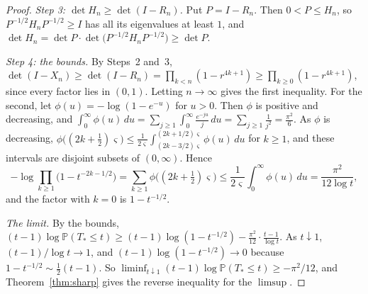 \documentclass[11pt]{amsart}
\theoremstyle{definition}
\theoremstyle{remark}
\numberwithin{equation}{section}
\newcommand{\PP}{\mathbb{P}}
\begin{document}
\begin{proof}
\emph{Step 3: $\det H_n\ge\det(I-R_n)$.} Put $P=I-R_n$. Then $0<P\le H_n$, so $P^{-1/2}H_nP^{-1/2}\ge I$ has all its eigenvalues at least $1$, and $\det H_n=\det P\cdot\det\bigl(P^{-1/2}H_nP^{-1/2}\bigr)\ge\det P$.

\emph{Step 4: the bounds.} By Steps~2 and~3, $\det(I-X_n)\ge\det(I-R_n)=\prod_{k<n}(1-r^{4k+1})\ge\prod_{k\ge0}(1-r^{4k+1})$, since every factor lies in $(0,1)$. Letting $n\to\infty$ gives the first inequality. For the second, let $\phi(u)=-\log(1-e^{-u})$ for $u>0$. Then $\phi$ is positive and decreasing, and $\int_0^\infty\phi(u)\,du=\sum_{j\ge1}\int_0^\infty\frac{e^{-ju}}j\,du=\sum_{j\ge1}\frac1{j^2}=\frac{\pi^2}6$. As $\phi$ is decreasing, $\phi\bigl((2k+\frac12)\varsigma\bigr)\le\frac1{2\varsigma}\int_{(2k-3/2)\varsigma}^{(2k+1/2)\varsigma}\phi(u)\,du$ for $k\ge1$, and these intervals are disjoint subsets of $(0,\infty)$. Hence
\[
-\log\prod_{k\ge1}\bigl(1-t^{-2k-1/2}\bigr)=\sum_{k\ge1}\phi\bigl((2k+\tfrac12)\varsigma\bigr)\le\frac1{2\varsigma}\int_0^\infty\phi(u)\,du=\frac{\pi^2}{12\log t},
\]
and the factor with $k=0$ is $1-t^{-1/2}$.

\emph{The limit.} By the bounds, $(t-1)\log\PP(T_*\le t)\ge(t-1)\log(1-t^{-1/2})-\frac{\pi^2}{12}\cdot\frac{t-1}{\log t}$. As $t\downarrow1$, $(t-1)/\log t\to1$, and $(t-1)\log(1-t^{-1/2})\to0$ because $1-t^{-1/2}\sim\frac12(t-1)$. So $\liminf_{t\downarrow1}(t-1)\log\PP(T_*\le t)\ge-\pi^2/12$, and Theorem~\ref{thm:sharp} gives the reverse inequality for the $\limsup$.
\end{proof}
\end{document}
